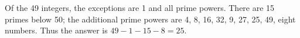 Of the 49 integers, the exceptions are 1 and all prime powers. There are 15 primes below 50; the additional prime powers are 4, 8, 16, 32, 9, 27, 25, 49, eight numbers. Thus the answer is $49-1-15-8=\boxed{25}$.
